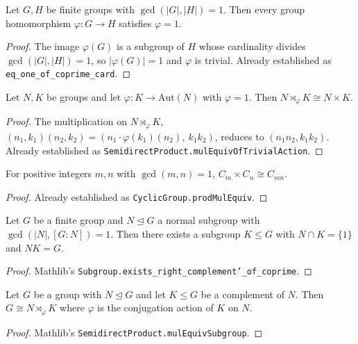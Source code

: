 \begin{lemma}
    \label{lem:eq-one-of-coprime-card}
    Let $G, H$ be finite groups with $\gcd(|G|, |H|) = 1$. Then every group
    homomorphism $\varphi : G \to H$ satisfies $\varphi = 1$.
\end{lemma}
\begin{proof}
    The image $\varphi(G)$ is a subgroup of $H$ whose cardinality divides
    $\gcd(|G|,|H|) = 1$, so $|\varphi(G)| = 1$ and $\varphi$ is trivial.
    Already established as \texttt{eq\_one\_of\_coprime\_card}.
\end{proof}

\begin{lemma}
    \label{lem:sdp-trivial-action}
    Let $N, K$ be groups and let $\varphi : K \to \mathrm{Aut}(N)$ with
    $\varphi = 1$. Then $N \rtimes_\varphi K \cong N \times K$.
\end{lemma}
\begin{proof}
    The multiplication on $N \rtimes_\varphi K$,
    $(n_1, k_1)(n_2, k_2) = (n_1 \cdot \varphi(k_1)(n_2),\ k_1 k_2)$,
    reduces to $(n_1 n_2, k_1 k_2)$. Already established as
    \texttt{SemidirectProduct.mulEquivOfTrivialAction}.
\end{proof}

\begin{lemma}
    \label{lem:cyclic-prod}
    For positive integers $m, n$ with $\gcd(m, n) = 1$,
    $C_m \times C_n \cong C_{mn}$.
\end{lemma}
\begin{proof}
    Already established as \texttt{CyclicGroup.prodMulEquiv}.
\end{proof}

\begin{lemma}
    \label{lem:schur-zassenhaus}
    Let $G$ be a finite group and $N \trianglelefteq G$ a normal subgroup
    with $\gcd(|N|, [G:N]) = 1$. Then there exists a subgroup $K \leq G$
    with $N \cap K = \{1\}$ and $NK = G$.
\end{lemma}
\begin{proof}
    Mathlib's \texttt{Subgroup.exists\_right\_complement'\_of\_coprime}.
\end{proof}

\begin{lemma}
    \label{lem:sdp-from-complement}
    Let $G$ be a group with $N \trianglelefteq G$ and let $K \leq G$ be a
    complement of $N$. Then $G \cong N \rtimes_\varphi K$ where $\varphi$ is
    the conjugation action of $K$ on $N$.
\end{lemma}
\begin{proof}
    Mathlib's \texttt{SemidirectProduct.mulEquivSubgroup}.
\end{proof}

